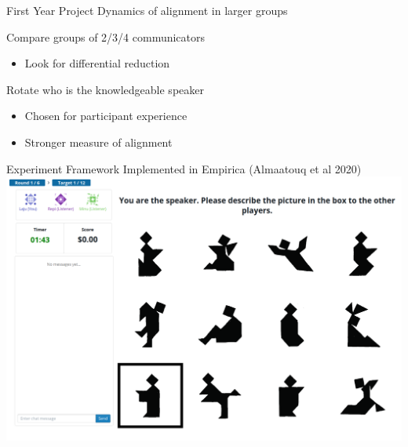 \documentclass[ 12pt, xcolor=beamer,table,usenames,dvipsnames, ignorenonframetext, ngerman]{beamer}
\begin{document}
%
\begin{frame}{First Year Project}
	Dynamics of alignment in larger groups \pause
	
	Compare groups of 2/3/4 communicators
	\begin{itemize}
		\item Look for differential reduction \pause
	\end{itemize} 
Rotate who is the knowledgeable speaker
\begin{itemize}
	\item Chosen for participant experience
	\item Stronger measure of alignment
\end{itemize}

\end{frame}

\begin{frame}{Experiment Framework}
Implemented in Empirica (Almaatouq et al 2020) 
 \includegraphics[width=.9\textwidth]{../images/interface.PNG}
\end{frame}
\end{document}

